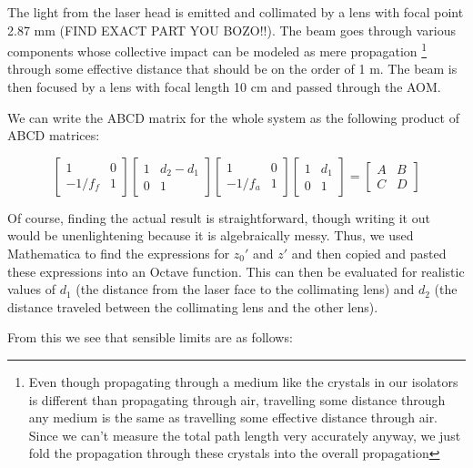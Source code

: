 The light from the laser head is emitted and collimated by a lens with focal point 2.87 mm (FIND EXACT PART YOU BOZO!!). The beam goes through various components whose collective impact can be modeled as mere propagation 
\footnote{Even though propagating through a medium like the crystals in our isolators is different than propagating through air, travelling some distance through any medium is the same as travelling some effective distance through air. Since we can't measure the total path length very accurately anyway, we just fold the propagation through these crystals into the overall propagation}
through some effective distance that should be on the order of 1 m. The beam is then focused by a lens with focal length 10 cm and passed through the AOM. 

We can write the ABCD matrix for the whole system as the following product of ABCD matrices: 

\begin{equation}
\begin{bmatrix}
1 & 0 \\ -1/f_{f} & 1
\end{bmatrix}
\begin{bmatrix}
1 & d_2-d_1 \\ 0 & 1
\end{bmatrix}
\begin{bmatrix}
1 & 0 \\ -1/f_{a} & 1
\end{bmatrix}
\begin{bmatrix}
1 & d_1 \\ 0 & 1
\end{bmatrix}
=
\begin{bmatrix}
A & B \\ C & D
\end{bmatrix}
\end{equation}

Of course, finding the actual result is straightforward, though writing it out would be unenlightening because it is algebraically messy. Thus, we used Mathematica to find the expressions for $z_0'$ and $z'$ and then copied and pasted these expressions into an Octave function. This can then be evaluated for realistic values of $d_1$ (the distance from the laser face to the collimating lens) and $d_2$ (the distance traveled between the collimating lens and the other lens). 

From this we see that sensible limits are as follows: 





